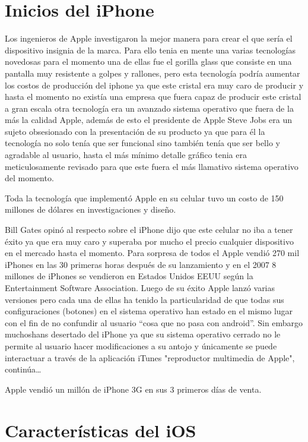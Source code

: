\section*{Inicios del iPhone}
Los ingenieros de Apple investigaron la mejor manera para crear el que sería el dispositivo insignia de la marca. Para ello tenia en mente una varias tecnologías novedosas 
para el momento una de ellas fue el gorilla glass que consiste en una pantalla muy resistente a golpes y rallones, pero esta tecnología podría aumentar los costos de 
producción del iphone ya que este cristal era muy caro de producir y hasta el momento no existía una empresa que fuera capaz  de producir este cristal a gran escala otra 
tecnología era un avanzado sistema operativo que fuera de la más la calidad Apple, además de esto el presidente de Apple Steve Jobs era un sujeto obsesionado con la 
presentación de su producto ya que para él la tecnología no solo tenía que ser funcional sino también tenía que ser bello y agradable al usuario, hasta el más mínimo 
detalle gráfico tenia era meticulosamente revisado para que este fuera el más llamativo sistema operativo del momento.

Toda la tecnología que implementó Apple en su celular tuvo un costo de 150 millones de dólares en investigaciones y diseño.

Bill Gates opinó al respecto sobre el iPhone dijo que este celular no iba a tener éxito ya que era muy caro y superaba por mucho el precio cualquier dispositivo  en el 
mercado hasta el momento. Para sorpresa de todos el Apple vendió 270 mil iPhones en las 30 primeras horas después de su lanzamiento y en el 2007 8 millones de iPhones se 
vendieron en Estados Unidos EEUU según la Entertainment Software Association. Luego de su éxito Apple lanzó varias versiones pero cada una de ellas ha tenido la 
particularidad de que todas sus configuraciones (botones) en el sistema operativo han estado en el mismo lugar con el fin de no confundir al usuario “cosa que no pasa con 
android”. Sin embargo muchoshans desertado del iPhone ya que su sistema operativo cerrado no le permite al usuario hacer modificaciones a su antojo y únicamente se puede 
interactuar a través de la aplicación iTunes "reproductor multimedia de Apple", continúa…

Apple vendió un millón de iPhone 3G en sus 3 primeros días de venta.

\section*{Características del iOS}
